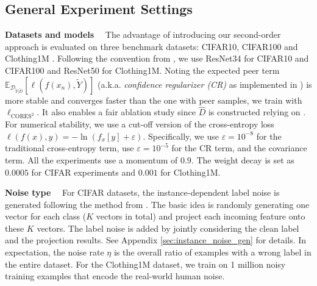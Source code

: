 \documentclass[final]{cvpr}
\newcommand{\estD}{{\hat D}}
\newcommand{\E}{\mathbb E}
\newcommand{\rev}[1]{{\color{blue}#1}}
\newcommand{\rev}[1]{#1}
\begin{document}
\subsection{General Experiment Settings}

\noindent\textbf{Datasets and models}~~
The advantage of introducing our second-order approach is evaluated on three benchmark datasets: CIFAR10, CIFAR100 \cite{krizhevsky2009learning} and Clothing1M \cite{xiao2015learning}. Following the convention from \cite{sieve2020,xu2019l_dmi}, we use ResNet34 for CIFAR10 and CIFAR100 and ResNet50 for Clothing1M.
Noting the expected peer term  $\E_{\mathcal{D}_{\widetilde{Y}|\widetilde{D}}}[\ell(f(x_n),\widetilde Y)]$ (a.k.a. \textit{confidence regularizer (CR)} as implemented in \cite{sieve2020}) is more stable and converges faster than the one with peer samples, we train with $\ell_{\text{CORES}^2}$.
It also enables a fair ablation study since $\estD$ is constructed relying on \cite{sieve2020}.
For numerical stability, we use a cut-off version of the cross-entropy loss $\ell(f(x),y) = -\ln(f_x[y]+\varepsilon)$.
Specifically, we use $\varepsilon = 10^{-8}$ for the traditional cross-entropy term, use $\varepsilon = 10^{-5}$ for the CR term, and the covariance term.
All the experiments use a momentum of $0.9$.
The weight decay is set as $0.0005$ for CIFAR experiments and $0.001$ for Clothing1M.

\noindent\textbf{Noise type}~~
For CIFAR datasets, the instance-dependent label noise is generated following the method from \cite{sieve2020,xia2020parts}.
\rev{The basic idea is randomly generating one vector for each class ($K$ vectors in total) and project each incoming  feature  onto  these $K$ vectors.
The label noise is added by jointly considering the clean label and the projection  results.
See Appendix \ref{sec:instance_noise_gen} for details.}
In expectation, the noise rate $\eta$ is the overall ratio of examples with a wrong label in the entire dataset.
For the Clothing1M dataset, we train on 1 million noisy training examples that encode the real-world human noise. 
\end{document}
